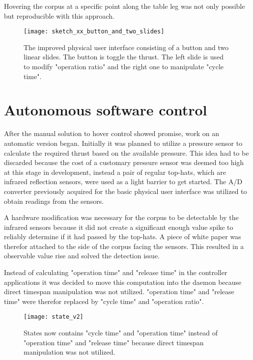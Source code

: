 Hovering the corpus at a specific point along the table leg was not only possible but reproducible with this approach.   

\begin{figure}[h]
\centering

\texttt{[image: sketch\_xx\_button\_and\_two\_slides]}

\caption{The improved physical user interface consisting of a button and two linear slides. The button is toggle the thrust. The left slide is used to modify "operation ratio" and the right one to manipulate "cycle time".}
\end{figure}

\section{Autonomous software control}
\author{Philip Trauner}

After the manual solution to hover control showed promise, work on an automatic version began. Initially it was planned to utilize a pressure sensor to calculate the required thrust based on the available pressure. This idea had to be discarded because the cost of a customary pressure sensor was deemed too high at this stage in development, instead a pair of regular top-hats, which are infrared reflection sensors, were used as a light barrier to get started. The A/D converter previously acquired for the basic physical user interface was utilized to obtain readings from the sensors.

A hardware modification was necessary for the corpus to be detectable by the infrared sensors because it did not create a significant enough value spike to reliably determine if it had passed by the top-hats.
A piece of white paper was therefor attached to the side of the corpus facing the sensors. This resulted in a observable value rise and solved the detection issue.

Instead of calculating "operation time" and "release time" in the controller applications it was decided to move this computation into the daemon because direct timespan manipulation was not utilized. "operation time" and "release time" were therefor replaced by "cycle time" and "operation ratio".

\begin{figure}[h]
\centering

\texttt{[image: state\_v2]}

\caption{States now contains "cycle time" and "operation time" instead of "operation time" and "release time" because direct timespan manipulation was not utilized.}
\end{figure}

